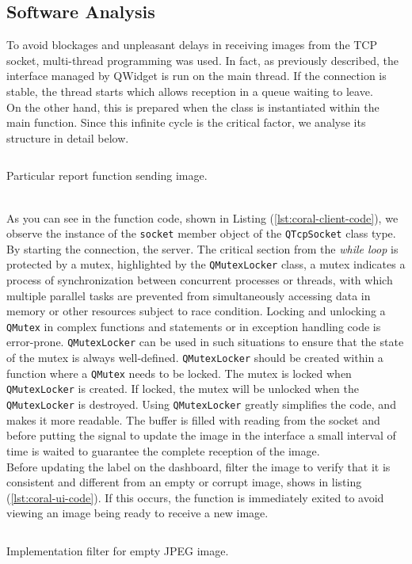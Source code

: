 \subsection{Software Analysis}
\label{ssec:software-coral-analysis}
To avoid blockages and unpleasant delays in receiving images from the TCP
socket, multi-thread programming was used. In fact, as previously described, the
interface managed by QWidget is run on the main thread. If the connection is
stable, the thread starts which allows reception in a queue waiting to leave.\\ 
On the other hand, this is prepared when the class is instantiated within the
main function. Since this infinite cycle is the critical factor, we analyse its
structure in detail below.
%
\begin{listing}[ht] 
\inputminted[frame=lines,framesep=2mm, linenos=true, autogobble, breaklines=true, fontsize=\scriptsize, firstline=12, lastline=26]{c++}{software/code/streamerthread.cpp} 
\caption{Particular report function sending image.} 
\label{lst:coral-client-code} 
\end{listing}
%
\\As you can see in the function code, shown in Listing
(\ref{lst:coral-client-code}), we observe the instance of the \texttt{socket}
member object of the \texttt{QTcpSocket} class type. 
By starting the connection, the server. 
The critical section from the \emph{while loop} is protected by a mutex,
highlighted by the \texttt{QMutexLocker} class, a mutex indicates a
process of synchronization between concurrent processes or threads, with which
multiple parallel tasks are prevented from simultaneously accessing 
data in memory or other resources subject to race condition.\cite{wiki:mutex} \hfill \break
Locking and unlocking a \texttt{QMutex} in complex functions and statements or
in exception handling code is error-prone.
\texttt{QMutexLocker} can be used in such situations to ensure that the state of the
mutex is always well-defined. \texttt{QMutexLocker} should be created within a
function where a \texttt{QMutex} needs to be locked. The mutex is locked when
\texttt{QMutexLocker} is created. If locked, the mutex will be unlocked when
the \texttt{QMutexLocker} is destroyed.
Using \texttt{QMutexLocker} greatly simplifies the code, and makes it more
readable.\cite{Qt:QMutexclass} \hfill \break
The buffer is filled with reading from the socket and before putting the signal
to update the image in the interface a small interval of time is waited to
guarantee the complete reception of the image.\\
Before updating the label on the dashboard, filter the image to verify that it
is consistent and different from an empty or corrupt image, shows in listing
(\ref{lst:coral-ui-code}). 
If this occurs, the function is immediately exited to
avoid viewing an image being ready to receive a new image. 
%
\begin{listing}[ht] 
\inputminted[frame=lines,framesep=2mm, linenos=true, autogobble, breaklines=true, fontsize=\scriptsize, firstline=88, lastline=100]{c++}{software/code/tcpclient.cpp} 
\caption{Implementation filter for empty JPEG image.} 
\label{lst:coral-ui-code} 
\end{listing}
